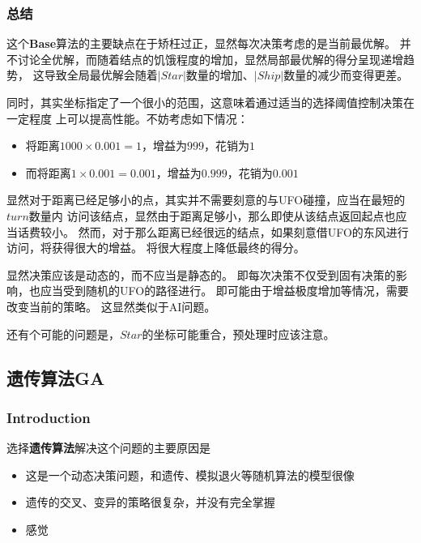 \documentclass[hyperref,UTF8]{ctexart}
\theoremstyle{definition}
\theoremstyle{remark}
\numberwithin{equation}{subsection}
\newcommand{\Emph}{\textbf}
\begin{document}
	
\subsubsection{总结}

	这个\Emph{Base}算法的主要缺点在于矫枉过正，显然每次决策考虑的是当前最优解。
	并不讨论全优解，而随着结点的饥饿程度的增加，显然局部最优解的得分呈现递增趋势，
	这导致全局最优解会随着$|Star|$数量的增加、$|Ship|$数量的减少而变得更差。
	
	同时，其实坐标指定了一个很小的范围，这意味着通过适当的选择阈值控制决策在一定程度
	上可以提高性能。不妨考虑如下情况：
	\begin{itemize}
	
		\item 将距离$1000 \times 0.001 = 1$，增益为$999$，花销为$1$
		
		\item 而将距离$1 \times 0.001 = 0.001$，增益为$0.999$，花销为$0.001$
		
	\end{itemize}
	
	显然对于距离已经足够小的点，其实并不需要刻意的与UFO碰撞，应当在最短的$turn$数量内
	访问该结点，显然由于距离足够小，那么即使从该结点返回起点也应当话费较小。
	然而，对于那么距离已经很远的结点，如果刻意借UFO的东风进行访问，将获得很大的增益。
	将很大程度上降低最终的得分。
	
	显然决策应该是动态的，而不应当是静态的。
	即每次决策不仅受到固有决策的影响，也应当受到随机的UFO的路径进行。
	即可能由于增益极度增加等情况，需要改变当前的策略。
	这显然类似于AI问题。
	
	还有个可能的问题是，$Star$的坐标可能重合，预处理时应该注意。
	
\subsection{遗传算法GA}
\label{sec:sa}

\subsubsection{Introduction}

	选择\Emph{遗传算法}解决这个问题的主要原因是
	\begin{itemize}
		
		\item 这是一个动态决策问题，和遗传、模拟退火等随机算法的模型很像
		
		\item 遗传的交叉、变异的策略很复杂，并没有完全掌握
		
		\item 感觉
		
	\end{itemize}
	
\end{document}
